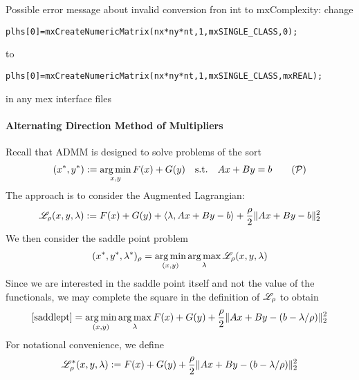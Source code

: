 \documentclass[12pt]{article}
\begin{document}
Possible error message about invalid conversion fron int to mxComplexity: change 

\begin{verbatim}
plhs[0]=mxCreateNumericMatrix(nx*ny*nt,1,mxSINGLE_CLASS,0);
\end{verbatim} 

to 

\begin{verbatim}
plhs[0]=mxCreateNumericMatrix(nx*ny*nt,1,mxSINGLE_CLASS,mxREAL);
\end{verbatim}

in any mex interface files

\paragraph{Alternating Direction Method of Multipliers}
Recall that ADMM is designed to solve problems of the sort 
\begin{align}
(x^*,y^*) : = \argmin_{x,y} F(x)+G(y)\quad \st\quad  Ax+By = b \tag{$\mathcal{P}$}
\end{align} The approach is to consider the Augmented Lagrangian: 
\begin{align*}
\mathscr{L}_\rho(x,y,\lambda) : = F(x)+G(y) + \left\langle \lambda, Ax+By-b\right \rangle +\frac{\rho}{2}\|Ax+By-b\|_2^2
\end{align*} We then consider the saddle point problem 
\begin{align}
(x^*,y^*,\lambda^*)_\rho = \operatorname*{arg\, min}_{(x,y)}\operatorname*{arg\, max}_\lambda \mathscr{L}_\rho(x,y,\lambda)\label{saddlept} 
\end{align}  Since we are interested in the saddle point itself and not the value of the functionals, we may complete the square in the definition of $\mathscr{L}_\rho$ to obtain 
\begin{align*}
\eqref{saddlept} = \operatorname*{arg\, min}_{(x,y)}\operatorname*{arg\, max}_\lambda F(x) + G(y) +\frac{\rho}{2}\|Ax+By-(b-\lambda/\rho)\|_2^2
\end{align*}For notational convenience, we define
\begin{align*}
\mathscr{L}_\rho^*(x,y,\lambda): =  F(x) + G(y) +\frac{\rho}{2}\|Ax+By-(b-\lambda/\rho)\|_2^2
\end{align*}
\end{document}
